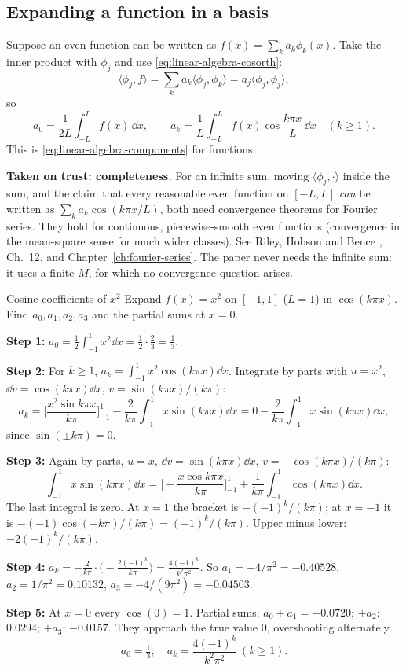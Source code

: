 \subsection{Expanding a function in a basis}

Suppose an even function can be written as $f(x)=\sum_ka_k\phi_k(x)$. Take the inner product with $\phi_j$ and use \cref{eq:linear-algebra-cosorth}:
\[
\langle\phi_j,f\rangle=\sum_ka_k\langle\phi_j,\phi_k\rangle=a_j\langle\phi_j,\phi_j\rangle ,
\]
so
\begin{equation}
a_0=\frac1{2L}\int_{-L}^{L}f(x)\,\dd x,\qquad a_k=\frac1L\int_{-L}^{L}f(x)\cos\frac{k\pi x}L\,\dd x\quad(k\ge1).
\label{eq:linear-algebra-coeffs}
\end{equation}
This is \cref{eq:linear-algebra-components} for functions.

\begin{beyond}
\textbf{Taken on trust: completeness.} For an infinite sum, moving $\langle\phi_j,\cdot\rangle$ inside the sum, and the claim that every reasonable even function on $[-L,L]$ \emph{can} be written as $\sum_ka_k\cos(k\pi x/L)$, both need convergence theorems for Fourier series. They hold for continuous, piecewise-smooth even functions (convergence in the mean-square sense for much wider classes). See Riley, Hobson and Bence \cite{rhb}, Ch.~12, and Chapter~\ref{ch:fourier-series}. The paper never needs the infinite sum: it uses a finite $M$, for which no convergence question arises.
\end{beyond}

\begin{sample}{Cosine coefficients of $x^2$}
Expand $f(x)=x^2$ on $[-1,1]$ ($L=1$) in $\cos(k\pi x)$. Find $a_0,a_1,a_2,a_3$ and the partial sums at $x=0$.

\textbf{Step 1:} $a_0=\frac12\int_{-1}^1x^2\dd x=\frac12\cdot\frac23=\frac13$.

\textbf{Step 2:} For $k\ge1$, $a_k=\int_{-1}^1x^2\cos(k\pi x)\dd x$. Integrate by parts with $u=x^2$, $\dd v=\cos(k\pi x)\dd x$, $v=\sin(k\pi x)/(k\pi)$:
\[
a_k=\Big[\frac{x^2\sin k\pi x}{k\pi}\Big]_{-1}^1-\frac2{k\pi}\int_{-1}^1x\sin(k\pi x)\dd x=0-\frac2{k\pi}\int_{-1}^1x\sin(k\pi x)\dd x ,
\]
since $\sin(\pm k\pi)=0$.

\textbf{Step 3:} Again by parts, $u=x$, $\dd v=\sin(k\pi x)\dd x$, $v=-\cos(k\pi x)/(k\pi)$:
\[
\int_{-1}^1x\sin(k\pi x)\dd x=\Big[-\frac{x\cos k\pi x}{k\pi}\Big]_{-1}^1+\frac1{k\pi}\int_{-1}^1\cos(k\pi x)\dd x .
\]
The last integral is zero. At $x=1$ the bracket is $-(-1)^k/(k\pi)$; at $x=-1$ it is $-(-1)\cos(-k\pi)/(k\pi)=(-1)^k/(k\pi)$. Upper minus lower: $-2(-1)^k/(k\pi)$.

\textbf{Step 4:} $a_k=-\frac{2}{k\pi}\cdot\Big(-\frac{2(-1)^k}{k\pi}\Big)=\frac{4(-1)^k}{k^2\pi^2}$. So $a_1=-4/\pi^2=-0.40528$, $a_2=1/\pi^2=0.10132$, $a_3=-4/(9\pi^2)=-0.04503$.

\textbf{Step 5:} At $x=0$ every $\cos(0)=1$. Partial sums: $a_0+a_1=-0.0720$; $+a_2$: $0.0294$; $+a_3$: $-0.0157$. They approach the true value $0$, overshooting alternately.
\[
\boxed{a_0=\tfrac13,\quad a_k=\frac{4(-1)^k}{k^2\pi^2}\ (k\ge1).}
\]
\end{sample}

